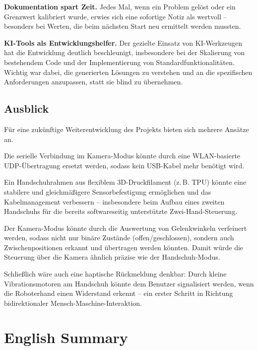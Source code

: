 \documentclass[12pt,a4paper]{article}
\begin{document}
\textbf{Dokumentation spart Zeit.} Jedes Mal, wenn ein Problem gelöst oder ein Grenzwert kalibriert wurde, erwies sich eine sofortige Notiz als wertvoll -- besonders bei Werten, die beim nächsten Start neu ermittelt werden mussten.

\textbf{KI-Tools als Entwicklungshelfer.} Der gezielte Einsatz von KI-Werkzeugen hat die Entwicklung deutlich beschleunigt, insbesondere bei der Skalierung von bestehendem Code und der Implementierung von Standardfunktionalitäten. Wichtig war dabei, die generierten Lösungen zu verstehen und an die spezifischen Anforderungen anzupassen, statt sie blind zu übernehmen.

\subsection{Ausblick}

Für eine zukünftige Weiterentwicklung des Projekts bieten sich mehrere Ansätze an.

Die serielle Verbindung im Kamera-Modus könnte durch eine WLAN-basierte UDP-Übertragung ersetzt werden, sodass kein USB-Kabel mehr benötigt wird.

Ein Handschuhrahmen aus flexiblem 3D-Druckfilament (z.\,B. TPU) könnte eine stabilere und gleichmäßigere Sensorbefestigung ermöglichen und das Kabelmanagement verbessern -- insbesondere beim Aufbau eines zweiten Handschuhs für die bereits softwareseitig unterstützte Zwei-Hand-Steuerung. 

Der Kamera-Modus könnte durch die Auswertung von Gelenkwinkeln verfeinert werden, sodass nicht nur binäre Zustände (offen/geschlossen), sondern auch Zwischenpositionen erkannt und übertragen werden könnten. Damit würde die Steuerung über die Kamera ähnlich präzise wie der Handschuh-Modus.

Schließlich wäre auch eine haptische Rückmeldung denkbar: Durch kleine Vibrationsmotoren am Handschuh könnte dem Benutzer signalisiert werden, wenn die Roboterhand einen Widerstand erkennt -- ein erster Schritt in Richtung bidirektionaler Mensch-Maschine-Interaktion.

\newpage

\section{English Summary}
\end{document}
